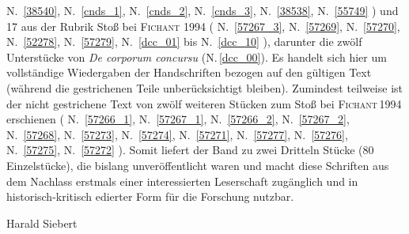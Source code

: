 N.~\ref{38540},
N.~\ref{cnds_1},
N.~\ref{cnds_2},
N.~\ref{cnds_3},
N.~\ref{38538},
N.~\ref{55749}%
) und 17 aus der Rubrik Stoß bei \textsc{Fichant 1994} (%
N.~\ref{57267_3},
N.~\ref{57269},
N.~\ref{57270},
N.~\ref{52278},
N.~\ref{57279},
N.~\ref{dcc_01} bis N.~\ref{dcc_10}%
), darunter die zwölf Unterstücke von \textit{De corporum concursu} (N.\,\ref{dcc_00}). Es handelt sich hier um vollständige Wiedergaben der Handschriften bezogen auf den gültigen Text (während die gestrichenen Teile unberücksichtigt bleiben). Zumindest teilweise ist der nicht gestrichene Text von zwölf weiteren Stücken zum Stoß bei \textsc{Fichant\,1994} erschienen (%
N.~\ref{57266_1},
N.~\ref{57267_1},
N.~\ref{57266_2},
N.~\ref{57267_2},
N.~\ref{57268},
N.~\ref{57273},
N.~\ref{57274},
N.~\ref{57271},
N.~\ref{57277},
N.~\ref{57276},
N.~\ref{57275},
N.~\ref{57272}%
). Somit liefert der Band zu zwei Dritteln Stücke (80 Einzelstücke), die bislang unveröffentlicht waren und macht diese Schriften aus dem Nachlass erstmals einer interessierten Leserschaft zugänglich und in historisch-kritisch edierter Form für die Forschung nutzbar.

\par
\par
\par
%
\vspace*{3em}
\hspace{104mm}Harald Siebert
%
%
%